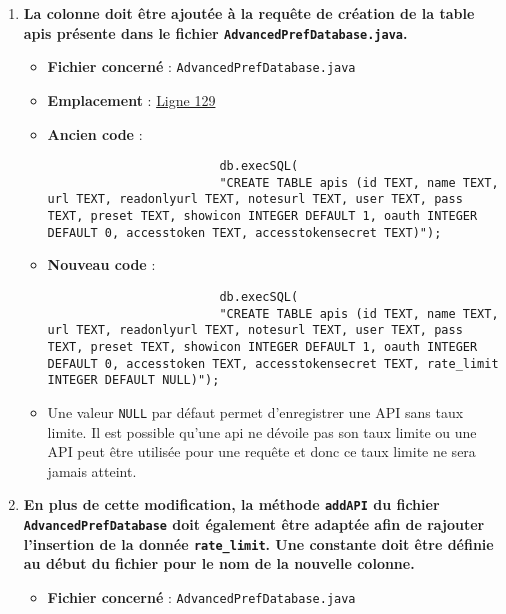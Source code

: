 \begin{enumerate}
    \item \textbf{La colonne doit être ajoutée à la requête de création de la table apis présente dans le fichier \texttt{AdvancedPrefDatabase.java}.}
          \begin{itemize}
              \item \textbf{Fichier concerné} : \texttt{AdvancedPrefDatabase.java}
              \item \textbf{Emplacement} :
                    \href{https://github.com/MarcusWolschon/osmeditor4android/blob/127fb689ad42c77558e4512e14de754e0561cd27/src/main/java/de/blau/android/prefs/AdvancedPrefDatabase.java#L129}{Ligne 129}
              \item \textbf{Ancien code} :
                    \begin{verbatim}
                        db.execSQL(
                        "CREATE TABLE apis (id TEXT, name TEXT, url TEXT, readonlyurl TEXT, notesurl TEXT, user TEXT, pass TEXT, preset TEXT, showicon INTEGER DEFAULT 1, oauth INTEGER DEFAULT 0, accesstoken TEXT, accesstokensecret TEXT)");
                    \end{verbatim}
              \item \textbf{Nouveau code} :
                    \begin{verbatim}
                        db.execSQL(
                        "CREATE TABLE apis (id TEXT, name TEXT, url TEXT, readonlyurl TEXT, notesurl TEXT, user TEXT, pass TEXT, preset TEXT, showicon INTEGER DEFAULT 1, oauth INTEGER DEFAULT 0, accesstoken TEXT, accesstokensecret TEXT, rate_limit INTEGER DEFAULT NULL)");
                    \end{verbatim}
              \item Une valeur \texttt{NULL} par défaut permet d'enregistrer une API sans taux limite. Il est possible qu'une api ne dévoile pas son taux limite ou une API peut être utilisée pour une requête et donc ce taux limite ne sera jamais atteint.
          \end{itemize}
    \item \textbf{En plus de cette modification, la méthode \texttt{addAPI} du fichier \texttt{AdvancedPrefDatabase} doit également être adaptée afin de rajouter l'insertion de la donnée \texttt{rate_limit}. Une constante doit être définie au début du fichier pour le nom de la nouvelle colonne.}
          \begin{itemize}
              \item \textbf{Fichier concerné} : \texttt{AdvancedPrefDatabase.java}

\end{itemize}
\end{enumerate}
